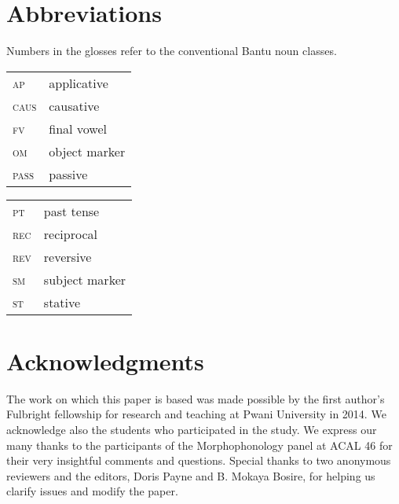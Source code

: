 \documentclass[output=paper]{langsci/langscibook}
\begin{document}
\section*{Abbreviations} 

Numbers in the glosses refer to the conventional Bantu noun classes.\\

\begin{tabularx}{.45\textwidth}{lX}
\textsc{ap} & applicative  \\
\textsc{caus} &  causative  \\ 
\textsc{fv} &  final vowel \\
\textsc{om} & object marker \\ 
\textsc{pass} & passive  \\
\end{tabularx}
\begin{tabularx}{.45\textwidth}{lX}
\textsc{pt} & past tense \\
\textsc{rec} & reciprocal  \\
\textsc{rev} & reversive \\ 
\textsc{sm} & subject marker \\
\textsc{st} & stative \\
\end{tabularx}       

\section*{Acknowledgments }

The work on which this paper is based was made possible by the first author’s Fulbright fellowship for research and teaching at Pwani University in 2014. We acknowledge also the students who participated in the study. We express our many thanks to the participants of the Morphophonology panel at ACAL 46 for their very insightful comments and questions. Special thanks to two anonymous reviewers and the editors, Doris Payne and B. Mokaya Bosire, for helping us clarify issues and modify the paper. 

\printbibliography[heading=subbibliography,notkeyword=this]
\end{document}
